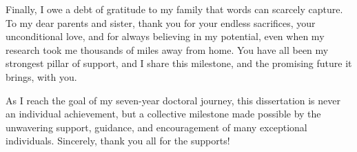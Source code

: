 \begin{acknowledgements}
Finally, I owe a debt of gratitude to my family that words can scarcely capture. To my dear parents and sister, thank you for your endless sacrifices, your unconditional love, and for always believing in my potential, even when my research took me thousands of miles away from home. You have all been my strongest pillar of support, and I share this milestone, and the promising future it brings, with you. 

As I reach the goal of my seven-year doctoral journey, this dissertation is never an individual achievement, but a collective milestone made possible by the unwavering support, guidance, and encouragement of many exceptional individuals. Sincerely, thank you all for the supports! 

\end{acknowledgements}
